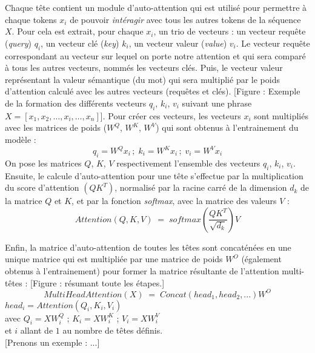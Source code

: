 \documentclass[12pt, french, twoside]{report}
\begin{document}
Chaque tête contient un module d'auto-attention qui est utilisé pour permettre à chaque tokens $x_i$ de pouvoir \textit{intéragir} avec tous les autres tokens de la séquence $X$. Pour cela est extrait, pour chaque $x_i$, un trio de vecteurs : un vecteur requête (\textit{query}) $q_i$, un vecteur clé (\textit{key}) $k_i$, un vecteur valeur (\textit{value}) $v_i$. Le vecteur requête correspondant au vecteur sur lequel on porte notre attention et qui sera comparé à tous les autres vecteurs, nommés les vecteurs clés. Puis, le vecteur valeur représentant la \og valeur sémantique (du mot)\fg\; qui sera multiplié par le poids d'attention calculé avec les autres vecteurs (requêtes et clés). [Figure : Exemple de la formation des différents vecteurs $q_i$, $k_i$, $v_i$ suivant une phrase $X = [x_1, x_2, \dots, x_i, \dots, x_n]$]. Pour créer ces vecteurs, les vecteurs $x_i$ sont multipliés avec les matrices de poids ($W^Q$, $W^K$, $W^V$) qui sont obtenus à l'entrainement du modèle : 
\[ q_i = W^Q x_i \,;\; k_i = W^K x_i \,;\; v_i = W^V x_i\]
On pose les matrices $Q$, $K$, $V$ respectivement l'ensemble des vecteurs $q_i$, $k_i$, $v_i$.\\

Ensuite, le calcule d'auto-attention pour une tête s'effectue par la multiplication du score d'attention $(QK^T)$, normalisé par la racine carré de la dimension $d_k$ de la matrice $Q$ et $K$, et par la fonction \textit{softmax}, avec la matrice des valeurs $V$ :
\[Attention(Q, K, V)\; =\; softmax(\frac{QK^T}{\sqrt{d_k}})V\]

Enfin, la matrice d'auto-attention de toutes les têtes sont concaténées en une unique matrice qui est multipliée par une matrice de poids $W^O$ (également obtenus à l'entrainement) pour former la matrice résultante de l'attention multi-têtes : [Figure : résumant toute les étapes.]
\[MultiHeadAttention(X)\;=\;Concat(head_1, head_2, ...)W^O\]
\hfill $head_i = Attention(Q_i, K_i, V_i)$\\
\vspace{2pt}
\hfill avec $Q_i = XW^Q_i$ ; $K_i = XW^K_i$ ; $V_i = XW^V_i$\\
\vspace{2pt}
\hfill et $i$ allant de $1$ au nombre de têtes définis.\\

[Prenons un exemple : ...]\\
\end{document}
